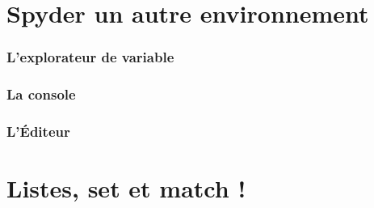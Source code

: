\section{Spyder un autre environnement }
\begin{frame}  \frametitle{L'explorateur de variable}
  
\end{frame}
\begin{frame}  \frametitle{La console}
  
\end{frame}
\begin{frame} \frametitle{L'Éditeur}
  
\end{frame}
\begin{frame}
  \frametitle{}
  
\end{frame}
\begin{frame}
  
\end{frame}

\section{Listes, set et match !}
\begin{frame}
  
\end{frame}
\begin{frame}
  
\end{frame}
\begin{frame}
  
\end{frame}
\begin{frame}
  
\end{frame}\begin{frame}
  
\end{frame}






